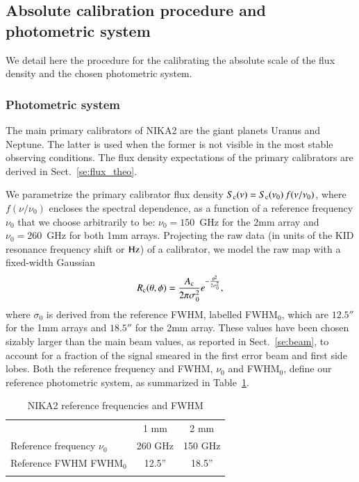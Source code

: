 \subsection{Absolute calibration procedure and photometric system}
\label{se:calibration_method}

We detail here the procedure for the calibrating the absolute scale of
the flux density and the chosen photometric system.

\subsubsection{Photometric system}
\label{se:photometric_system}

The main primary calibrators of NIKA2 are the giant planets Uranus and
Neptune. The latter is used when the former is not visible in the most
stable observing conditions. The flux density expectations of the
primary calibrators are derived in Sect.~\ref{se:flux_theo}. 

We parametrize the primary calibrator flux density
$S_{\rm{c}}(\nu) = S_{\rm{c}}(\nu_0)\, f(\nu/\nu_{0})$, where $f(\nu/\nu_{0})$
encloses the spectral dependence, 
as a function of a reference frequency $\nu_{0}$ that we choose
arbitrarily to be: $\nu_{0} = 150$~GHz for the 2mm array and
$\nu_{0}= 260$~GHz for both 1mm arrays. Projecting the raw data (in
units of the KID resonance frequency shift or $\rm Hz$) of a
calibrator, we model the raw map with a fixed-width Gaussian
\begin{equation}
  R_{\rm{c}}(\theta, \phi)  = \frac{A_{\rm{c}}}{2 \pi \sigma_{0}^{2}}
  e^{-\frac{\theta^{2}}{2\sigma_{0}^{2}}},
  \label{eq:gaussian_amplitude}
\end{equation}
where $\sigma_{0}$ is derived from the
reference FWHM, labelled FWHM$_{0}$, which are $12.5''$ for the 1mm
arrays and $18.5''$ for the 2mm array. These values have
been chosen sizably larger than the main beam values, as reported in
Sect.~\ref{se:beam}, to account for a fraction of the signal smeared 
in the first error beam and first side lobes.
Both the reference frequency and FWHM, $\nu_0$ and FWHM$_{0}$, define our reference photometric system, as
summarized in Table~\ref{tab:definitions}.

\begin{table}[!htbp]
  \begin{center}
    \caption{NIKA2 reference frequencies and FWHM}
    \begin{tabular}{lcc}
      \hline\hline
      \noalign{\smallskip}
      & 1 mm & 2 mm \\
      \noalign{\smallskip}
      \hline
      \noalign{\smallskip}
      Reference frequency $\nu_{0}$ & 260 GHz & 150 GHz \\
      Reference FWHM  FWHM$_{0}$    & 12.5'' & 18.5'' \\
      \noalign{\smallskip}
      \hline
    \end{tabular}
  \end{center}
  \label{tab:definitions}
\end{table}

